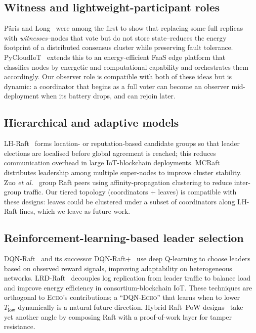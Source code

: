 \documentclass[conference]{IEEEtran}
\newcommand{\echoproto}{\textsc{Echo}\xspace}
\begin{document}
\subsection{Witness and lightweight-participant roles}
Pâris and Long~\cite{paris2015reducing} were among the first to show
that replacing some full replicas with \emph{witnesses}--nodes that
vote but do not store state--reduces the energy footprint of a
distributed consensus cluster while preserving fault tolerance.
PyCloudIoT~\cite{blanco2023pycloudiot} extends this to an
energy-efficient FaaS edge platform that classifies nodes by energetic
and computational capability and orchestrates them accordingly. Our
observer role is compatible with both of these ideas but is dynamic:
a coordinator that begins as a full voter can become an observer
mid-deployment when its battery drops, and can rejoin later.

\subsection{Hierarchical and adaptive models}
LH-Raft~\cite{guo2022lhraft} forms location- or reputation-based
candidate groups so that leader elections are localised before global
agreement is reached; this reduces communication overhead in large
IoT-blockchain deployments. MCRaft~\cite{xu2022mcraft} distributes
leadership among multiple super-nodes to improve cluster stability.
Zuo \emph{et al.}~\cite{zuo2024raftgrouping} group Raft peers using
affinity-propagation clustering to reduce inter-group traffic. Our
tiered topology (coordinators + leaves) is compatible with these
designs: leaves could be clustered under a subset of coordinators along
LH-Raft lines, which we leave as future work.

\subsection{Reinforcement-learning-based leader selection}
DQN-Raft~\cite{liu2022dqnraft} and its successor
DQN-Raft+~\cite{wang2025dqnraftplus} use deep Q-learning to choose
leaders based on observed reward signals, improving adaptability on
heterogeneous networks. LRD-Raft~\cite{yang2025lrdraft} decouples log
replication from leader traffic to balance load and improve energy
efficiency in consortium-blockchain IoT. These techniques are
orthogonal to \echoproto's contributions; a ``DQN-\echoproto'' that
learns when to lower $T_{\text{low}}$ dynamically is a natural future
direction. Hybrid Raft--PoW designs~\cite{ulukok2025hybridraftpow} take
yet another angle by composing Raft with a proof-of-work layer for
tamper resistance.
\end{document}
